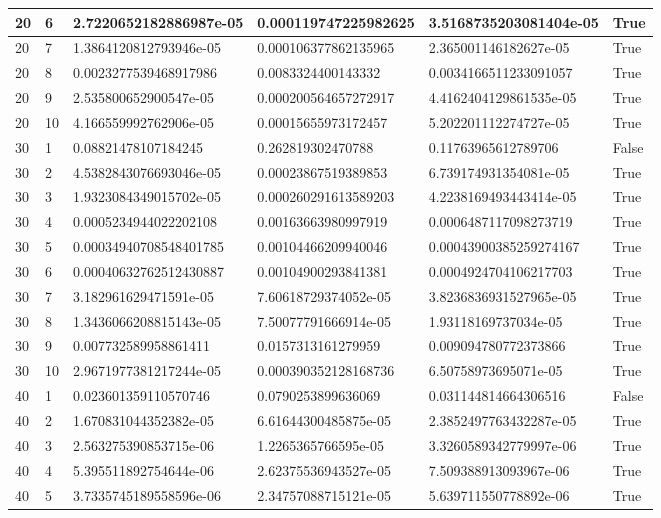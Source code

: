 \documentclass[a4paper, 12pt]{report}
\def\tabsize{4.4cm}
\def\stabsize{0.97cm}
\def\mtabsize{0.73cm}
\begin{document}
\begin{center}
\begin{longtable}{|m{\stabsize}|m{\stabsize}|m{\tabsize}|m{\tabsize}|m{\tabsize}|m{\mtabsize}|}
20 & 6 & 2.7220652182886987e-05 & 0.000119747225982625 & 3.5168735203081404e-05 & True \\ \hline  
20 & 7 & 1.3864120812793946e-05 & 0.000106377862135965 & 2.365001146182627e-05 & True \\ \hline  
20 & 8 & 0.0023277539468917986 & 0.0083324400143332 & 0.0034166511233091057 & True \\ \hline  
20 & 9 & 2.535800652900547e-05 & 0.000200564657272917 & 4.4162404129861535e-05 & True \\ \hline  
20 & 10 & 4.166559992762906e-05 & 0.00015655973172457 & 5.202201112274727e-05 & True \\ \hline  
30 & 1 & 0.08821478107184245 & 0.262819302470788 & 0.11763965612789706 & False \\ \hline  
30 & 2 & 4.5382843076693046e-05 & 0.00023867519389853 & 6.739174931354081e-05 & True \\ \hline  
30 & 3 & 1.9323084349015702e-05 & 0.000260291613589203 & 4.2238169493443414e-05 & True \\ \hline  
30 & 4 & 0.0005234944022202108 & 0.00163663980997919 & 0.0006487117098273719 & True \\ \hline  
30 & 5 & 0.00034940708548401785 & 0.00104466209940046 & 0.00043900385259274167 & True \\ \hline  
30 & 6 & 0.00040632762512430887 & 0.00104900293841381 & 0.0004924704106217703 & True \\ \hline  
30 & 7 & 3.182961629471591e-05 & 7.60618729374052e-05 & 3.8236836931527965e-05 & True \\ \hline  
30 & 8 & 1.3436066208815143e-05 & 7.50077791666914e-05 & 1.93118169737034e-05 & True \\ \hline  
30 & 9 & 0.007732589958861411 & 0.0157313161279959 & 0.009094780772373866 & True \\ \hline  
30 & 10 & 2.9671977381217244e-05 & 0.000390352128168736 & 6.50758973695071e-05 & True \\ \hline  
40 & 1 & 0.023601359110570746 & 0.0790253899636069 & 0.031144814664306516 & False \\ \hline  
40 & 2 & 1.670831044352382e-05 & 6.61644300485875e-05 & 2.3852497763432287e-05 & True \\ \hline  
40 & 3 & 2.563275390853715e-06 & 1.2265365766595e-05 & 3.3260589342779997e-06 & True \\ \hline  
40 & 4 & 5.395511892754644e-06 & 2.62375536943527e-05 & 7.509388913093967e-06 & True \\ \hline  
40 & 5 & 3.7335745189558596e-06 & 2.34757088715121e-05 & 5.639711550778892e-06 & True \\ \hline  

\end{longtable}
\end{center}
\end{document}
